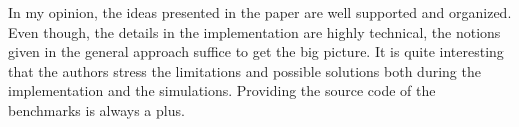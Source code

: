 \documentclass[a4paper,10pt]{scrartcl}
\begin{document}
In my opinion, the ideas presented in the paper are well supported and organized.  Even though, the details in the implementation are highly technical, the notions given in the general approach suffice to get the big picture.  It is quite interesting that the authors stress the limitations and possible solutions both during the implementation and the simulations.  Providing the source code of the benchmarks is always a plus.

\end{document}
